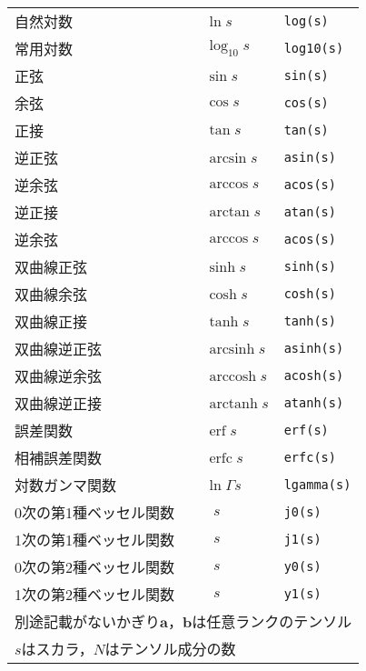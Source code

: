 \begin{longtable}{Xlll}
 自然対数 &  & $\ln s$ & \verb|log(s)| \\
 常用対数 &  & $\log_{10}s$ & \verb|log10(s)| \\
 正弦 &  & $\sin s$ & \verb|sin(s)| \\
 余弦 &  & $\cos s$ & \verb|cos(s)| \\
 正接 &  & $\tan s$ & \verb|tan(s)| \\
 逆正弦 &  & $\arcsin s$ & \verb|asin(s)| \\
 逆余弦 &  & $\arccos s$ & \verb|acos(s)| \\
 逆正接 &  & $\arctan s$ & \verb|atan(s)| \\
 逆余弦 &  & $\arccos s$ & \verb|acos(s)| \\
 双曲線正弦 &  & $\sinh s$ & \verb|sinh(s)| \\
 双曲線余弦 &  & $\cosh s$ & \verb|cosh(s)| \\
 双曲線正接 &  & $\tanh s$ & \verb|tanh(s)| \\
 双曲線逆正弦 &  & $\mathop{\mathrm{arcsinh}} s$ & \verb|asinh(s)| \\
 双曲線逆余弦 &  & $\mathop{\mathrm{arccosh}} s$ & \verb|acosh(s)| \\
 双曲線逆正接 &  & $\mathop{\mathrm{arctanh}} s$ & \verb|atanh(s)| \\
 誤差関数 &  & $\mathop{\mathrm{erf}} s$ & \verb|erf(s)| \\
 相補誤差関数 &  & $\mathop{\mathrm{erfc}} s$ & \verb|erfc(s)| \\
 対数ガンマ関数 &  & $\ln\Gamma s$ & \verb|lgamma(s)| \\
 0次の第1種ベッセル関数 &  & $\mathop{J_{0}}s$ & \verb|j0(s)| \\
 1次の第1種ベッセル関数 &  & $\mathop{J_{1}}s$ & \verb|j1(s)| \\
 0次の第2種ベッセル関数 &  & $\mathop{Y_{0}}s$ & \verb|y0(s)| \\
 1次の第2種ベッセル関数 &  & $\mathop{Y_{1}}s$ & \verb|y1(s)| \\
 \hline
 \multicolumn{4}{l}{別途記載がないかぎり$\bm{a}$，$\bm{b}$は任意ランクのテンソル} \\
 \multicolumn{4}{l}{$s$はスカラ，$N$はテンソル成分の数} \\
\end{longtable}

